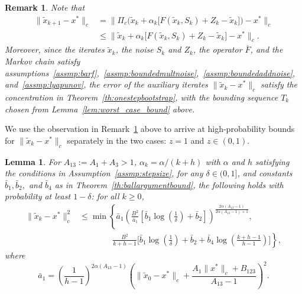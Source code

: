 \documentclass{article}
\newcommand{\lrp}[1]{\left( #1 \right)}
\newtheorem{lemma}[theorem]{Lemma}
\newtheorem{remark}{Remark}
\begin{document}
\begin{remark}\label{rem:concaux} Note that
\begin{align*}
    \| \tilde{x}_{k+1} - x^* \|_c &= \Big\| \Pi_c\Big(\tilde{x}_k + \alpha_k \big[ F(\tilde{x}_k, S_k) + Z_k - \tilde{x}_k \big] \Big) - x^* \Big\|_c \\
    &\leq \Big\| \tilde{x}_k + \alpha_k \big[ F(\tilde{x}_k, S_k) + Z_k - \tilde{x}_k \big] - x^* \Big\|_c.
\end{align*}
Moreover, since the iterates $\tilde{x}_k$, the noise $S_k$ and $Z_k$, the operator $\bar{F}$, and the Markov chain satisfy assumptions~\ref{assmp:barf},~\ref{assmp:boundedmultnoise},~\ref{assmp:boundedaddnoise}, and~\ref{assmp:lyapunov}, the error of the auxiliary iterates $\|\tilde{x}_k - x^*\|_c$ satisfy the concentration in Theorem~\ref{th:onestepbootstrap}, with the bounding sequence $T_k$ chosen from Lemma~\ref{lem:worst_case_bound} above. 
\end{remark}
We use the observation in Remark~\ref{rem:concaux} above to arrive at high-probability bounds for $\|\tilde{x}_k-x^*\|_c$ separately in the two cases: $z=1$ and $z\in(0,1)$. %
\begin{lemma}\label{lem:ballbound1}
    For $A_{13}:= A_1 + A_3 > 1$, $\alpha_k = \alpha/(k+h)$ with $\alpha$ and $h$ satisfying the conditions in Assumption~\ref{assmp:stepsize}, for any $\delta\in(0,1]$, and constants $\bar{b}_1, \bar{b}_2,$ and $\bar{b}_4$ as in Theorem~\ref{th:ballargumentbound}, the following holds  with probability at least $1-\delta$: for all $k \ge 0$,
    \begin{align*}
 \|\tilde{x}_k - x^*\|^2_c 
&\leq \min\left\{ \bar{a}_1 \lrp{\frac{B^2}{\bar{a}_1} \left[\bar{b}_1\log\left(\frac{1}{\delta}\right) + \bar{b}_2 \right]}^\frac{2\alpha (A_{13}-1)}{2\alpha (A_{13}-1) + 1}, \right. \\
&\qquad\qquad\left. \frac{B^2}{k+h-1} \bigg[\bar{b}_1\log\left(\frac{1}{\delta}\right) + \bar{b}_2 + \bar{b}_4 \log\left(\frac{k+h-1}{h-1}\right)\bigg] \right\},
\end{align*}
where
\[ \bar{a}_1 = \lrp{\frac{1}{h-1}}^{2\alpha(A_{13}-1)}\lrp{\|\tilde{x}_0 - x^*\|_c + \frac{A_1 \|x^*\|_c + B_{123}}{A_{13}-1}}^2. \]  
\end{lemma}
\end{document}
